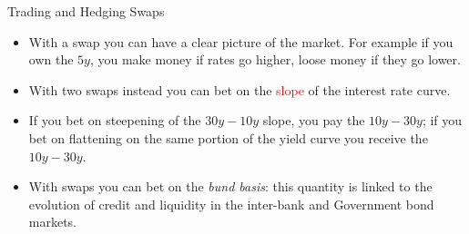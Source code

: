 \documentclass{beamer}
\begin{document}

\begin{frame}{Trading and Hedging Swaps}
	\begin{itemize}
		\item With a swap you can have a clear picture of the market. For example if you own the $5y$, you make money if rates go higher, loose money if they go lower.
		\item With two swaps instead you can bet on the \textcolor{red}{slope} of the interest rate curve.
		\item If you bet on steepening of the $30y-10y$ slope, you pay the $10y-30y$; if you bet on flattening on the same portion of the yield curve you receive the $10y-30y$.		
		\item With swaps you can bet on the \emph{bund basis}: this quantity is linked to the evolution of credit and liquidity in the inter-bank and Government bond markets.
	\end{itemize}
\end{frame}

\end{document}

